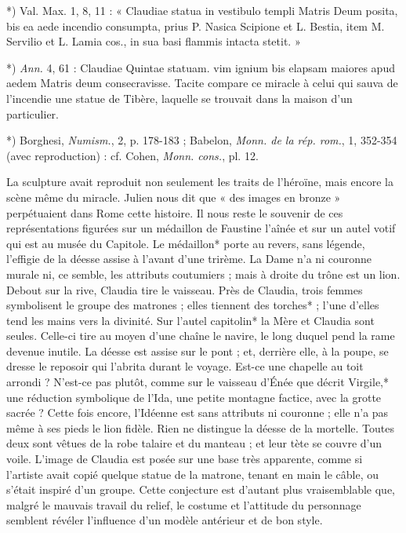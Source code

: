 \documentclass[a4paper, 11pt, oneside, polutonikogreek, french]{article}
\begin{document}
*) Val. Max. 1, 8, 11 : « Claudiae statua in vestibulo templi Matris Deum posita, bis ea aede incendio consumpta, prius P. Nasica Scipione et L. Bestia, item M. Servilio et L. Lamia cos., in sua basi flammis intacta stetit. »

*) \emph{Ann.} 4, 61 : Claudiae Quintae statuam. vim ignium bis elapsam maiores apud aedem Matris deum consecravisse. Tacite compare ce miracle à celui qui sauva de l'incendie une statue de Tibère, laquelle se trouvait dans la maison d'un particulier.

*) Borghesi, \emph{Numism.}, 2, p. 178-183 ; Babelon, \emph{Monn. de la rép. rom.}, 1, 352-354 (avec reproduction) : cf. Cohen, \emph{Monn. cons.}, pl. 12.

La sculpture avait reproduit non seulement les traits de l'héroïne, mais encore la scène même du miracle. Julien nous dit que « des images en bronze » perpétuaient dans Rome cette histoire. Il nous reste le souvenir de ces représentations figurées sur un médaillon de Faustine l'aînée et sur un autel votif qui est au musée du Capitole. Le médaillon* porte au revers, sans légende, l'effigie de la déesse assise à l'avant d'une trirème. La Dame n'a ni couronne murale ni, ce semble, les attributs coutumiers ; mais à droite du trône est un lion. Debout sur la rive, Claudia tire le vaisseau. Près de Claudia, trois femmes symbolisent le groupe des matrones ; elles tiennent des torches* ; l'une d'elles tend les mains vers la divinité. Sur l'autel capitolin* la Mère et Claudia sont seules. Celle-ci tire au moyen d'une chaîne le navire, le long duquel pend la rame devenue inutile. La déesse est assise sur le pont ; et, derrière elle, à la poupe, se dresse le reposoir qui l'abrita durant le voyage. Est-ce une chapelle au toit arrondi ? N'est-ce pas plutôt, comme sur le vaisseau d'Énée que décrit Virgile,* une réduction symbolique de l'Ida, une petite montagne factice, avec la grotte sacrée ? Cette fois encore, l'Idéenne est sans attributs ni couronne ; elle n'a pas même à ses pieds le lion fidèle. Rien ne distingue la déesse de la mortelle. Toutes deux sont vêtues de la robe talaire et du manteau ; et leur tète se couvre d'un voile. L'image de Claudia est posée sur une base très apparente, comme si l'artiste avait copié quelque statue de la matrone, tenant en main le câble, ou s'était inspiré d'un groupe. Cette conjecture est d'autant plus vraisemblable que, malgré le mauvais travail du relief, le costume et l'attitude du personnage semblent révéler l'influence d'un modèle antérieur et de bon style.
\end{document}
